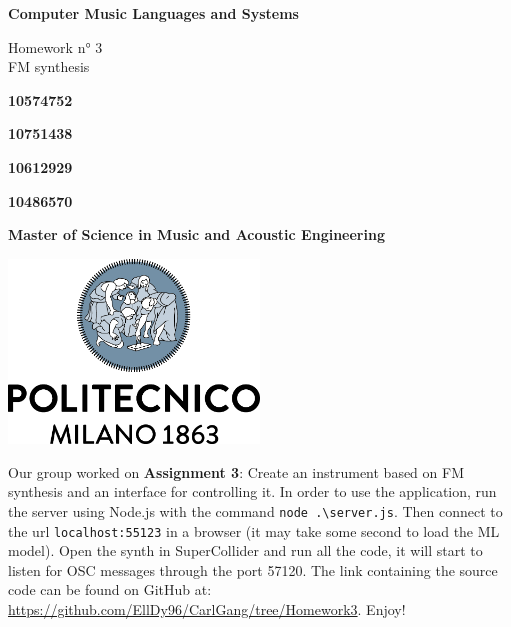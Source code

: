 \documentclass[a4paper,12pt]{report}
\begin{document}
\begin{titlepage}
\begin{center}
    \vspace*{1cm}
    
    \Huge
    \textbf{Computer Music Languages and Systems}
    
    \vspace{0.5cm}
    \LARGE
    Homework n° 3\\
   	FM synthesis

    \vspace{1 cm}
    
    \textbf{10574752}
    
    \vspace{0.5cm}
    
    \textbf{10751438}
     
    \vspace{0.5cm}
    
    \textbf{10612929}
     
    
    \vspace{0.5cm}
    
    \textbf{10486570}
    
    \vspace{0.5cm}
    
    \vfill
  
   
    \date{May 2021}
    \vspace{0.3cm}
    \textbf{Master of Science in Music and Acoustic Engineering}
    
    \vspace{0.8cm}
    
    \includegraphics[width=0.5\textwidth]{logo_positivo.png}
    
\end{center}
\end{titlepage}


\abstract{}
Our group worked on \textbf{Assignment 3}: Create an instrument based on FM synthesis and an interface for controlling it. In order to use the application, run the server using Node.js with the command \verb"node .\server.js". Then connect to the url \verb"localhost:55123" in a browser (it may take some second to load the ML model). Open the synth in SuperCollider and run all the code, it will start to listen for OSC messages through the port 57120. The link containing the source code can be found on GitHub at: \url{https://github.com/EllDy96/CarlGang/tree/Homework3}. Enjoy!
\endabstract{}
\end{document}
